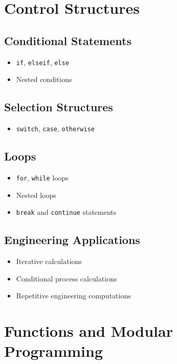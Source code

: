 \documentclass[11pt, a4paper]{article}
\begin{document}
\section{Control Structures}

\subsection{Conditional Statements}
\begin{itemize}
  \item \texttt{if}, \texttt{elseif}, \texttt{else}
  \item Nested conditions
\end{itemize}

\subsection{Selection Structures}
\begin{itemize}
  \item \texttt{switch}, \texttt{case}, \texttt{otherwise}
\end{itemize}

\subsection{Loops}
\begin{itemize}
  \item \texttt{for}, \texttt{while} loops
  \item Nested loops
  \item \texttt{break} and \texttt{continue} statements
\end{itemize}

\subsection{Engineering Applications}
\begin{itemize}
  \item Iterative calculations
  \item Conditional process calculations
  \item Repetitive engineering computations
\end{itemize}

\section{Functions and Modular Programming}
\end{document}
